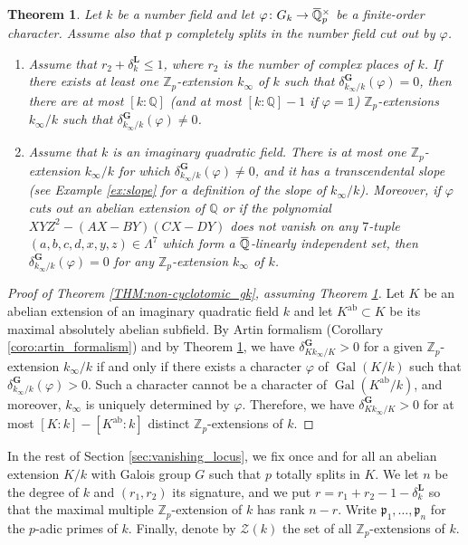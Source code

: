 \documentclass[12pt]{amsart}
\newcommand{\Q}{\mathbb{Q}}
\newcommand\bQ{\mathbb{Q}}
\newcommand\Zp{{\mathbb{Z}_p}}
\newcommand\gp{\mathfrak{p}}
\newcommand\sZ{\mathscr{Z}}
\newcommand{\ob}[1]{\mkern 1.5mu\overline{\mkern-1.5mu#1\mkern-1.5mu}\mkern 1.5mu}
\newcommand{\ab}{\textrm{ab}}
\DeclareMathOperator{\Gal}{Gal}
\theoremstyle{defstyle}
\theoremstyle{thmstyle}
\newtheorem{theorem}[subsubsection]{Theorem}
\begin{document}
	\begin{theorem}\label{thm:non_cyclotomic_defects}
		Let $k$ be a number field and let $\varphi \colon G_k \to \ob{\bQ}_p^\times$ be a finite-order character. Assume also that $p$ completely splits in the number field cut out by $\varphi$.
		\begin{enumerate}
			\item Assume that $r_2+\delta^\textbf{L}_k\leq 1$, where $r_2$ is the number of complex places of $k$. If there exists at least one $\Zp$-extension $k_\infty$ of $k$ such that $\delta_{k_\infty/k}^\textbf{G}(\varphi)=0$, then there are at most $[k:\Q]$ (and at most $[k:\Q]-1$ if $\varphi=\mathds{1}$) $\Zp$-extensions $k_\infty/k$ such that $\delta_{k_\infty/k}^\textbf{G}(\varphi)\neq 0$.
			\item Assume that $k$ is an imaginary quadratic field. There is at most one $\Zp$-extension $k_\infty/k$ for which $\delta_{k_\infty/k}^\textbf{G}(\varphi)\neq 0$, and it has a transcendental slope (see Example \ref{ex:slope} for a definition of the slope of $k_\infty/k$). Moreover, if $\varphi$ cuts out an abelian extension of $\Q$ or if the polynomial 
			$XYZ^2-(AX-BY)(CX-DY)$
			does not vanish on any $7$-tuple $(a,b,c,d,x,y,z)\in\Lambda^7$ which form a $\ob{\bQ}$-linearly independent set, then $\delta^\textbf{G}_{k_\infty/k}(\varphi)=0$ for any $\Zp$-extension $k_\infty$ of $k$. 
		\end{enumerate}
	\end{theorem}
	\begin{proof}[Proof of Theorem \ref{THM:non-cyclotomic_gk}, assuming Theorem \ref{thm:non_cyclotomic_defects}]
		Let $K$ be an abelian extension of an imaginary quadratic field $k$ and let $K^\ab \subset K$ be its maximal absolutely abelian subfield. By Artin formalism (Corollary \ref{coro:artin_formalism}) and by Theorem \ref{thm:non_cyclotomic_defects}, we have $\delta^\textbf{G}_{K k_\infty/K}>0$ for a given $\Zp$-extension $k_\infty/k$ if and only if there exists a character $\varphi$ of $\Gal(K/k)$ such that $\delta_{k_\infty/k}^\textbf{G}(\varphi)> 0$. Such a character cannot be a character of $\Gal(K^\ab/k)$, and moreover, $k_\infty$ is uniquely determined by $\varphi$. Therefore, we have $\delta^\textbf{G}_{K k_\infty/K}>0$ for at most $[K:k]-[K^\ab:k]$ distinct $\Zp$-extensions of $k$.
	\end{proof}
	
	In the rest of Section \ref{sec:vanishing_locus}, we fix once and for all an abelian extension $K/k$ with Galois group $G$ such that $p$ totally splits in $K$. We let $n$ be the degree of $k$ and $(r_1,r_2)$ its signature, and we put $r=r_1+r_2-1-\delta^\textbf{L}_k$ so that the maximal multiple $\Zp$-extension of $k$ has rank $n-r$. Write $\gp_1,\ldots,\gp_n$ for the $p$-adic primes of $k$. Finally, denote by $\sZ(k)$ the set of all $\Zp$-extensions of $k$. 
	
\end{document}
